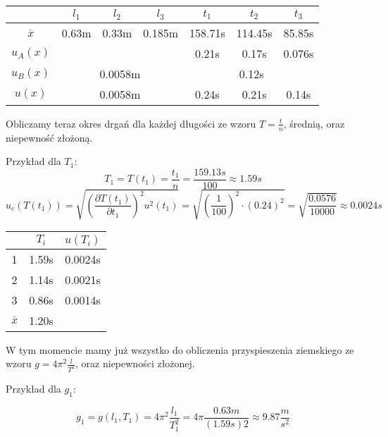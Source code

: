 \begin{center}
    \begin{tabular}[h]{|c|c|c|c||c|c|c|}
        \hline
                       & $l_1$ & $l_2$ & $l_3$         & $t_1$    & $t_2$   & $t_3$ \\
        \hline
        $\overline{x}$ & 0.63m & 0.33m & 0.185m        & 158.71s  & 114.45s & 85.85s \\
        \hline
        $u_A(x)$       &  \multicolumn{3}{|c||}{\cellcolor{black!10}}       & 0.21s & 0.17s & 0.076s \\
        \hline
        $u_B(x)$       & \multicolumn{3}{c||}{0.0058m} & \multicolumn{3}{c|}{0.12s} \\
        \hline
        $u(x)$         & \multicolumn{3}{c||}{0.0058m} & 0.24s & 0.21s & 0.14s \\
        \hline
    \end{tabular}
\end{center}
Obliczamy teraz okres drgań dla każdej długości ze wzoru $T = \frac{t}{n}$, średnią, oraz niepewność złożoną.

\indent Przykład dla $T_1$:
$$ T_1 = T(t_1) = \frac{t_1}{n} = \frac{159.13s}{100} \approx 1.59s $$
$$
u_c(T(t_1)) = \sqrt{ \left( \frac{\partial T(t_1)}{\partial t_1} \right)^2 u^2(t_1)}
= \sqrt{ \left( \frac{1}{100} \right)^2 \cdot (0.24)^2}
= \sqrt{\frac{0.0576}{10000}} \approx 0.0024s
$$

\begin{center}
    \begin{tabular}[h]{|c|c|c|}
        \hline
        {}             & $T_i$ & $u(T_i)$ \\
        \hline
        1              & 1.59s & 0.0024s \\
        2              & 1.14s & 0.0021s \\
        3              & 0.86s & 0.0014s \\
        \hline
        $\overline{x}$ & 1.20s & \cellcolor{black!10} \\
        \hline
    \end{tabular}
\end{center}

W tym momencie mamy już wszystko do obliczenia przyspieszenia ziemskiego ze wzoru $\displaystyle g = 4\pi^2 \frac{l}{T^2}$, oraz niepewności złożonej.

\indent Przykład dla $g_1$:

$$ g_1 = g(l_1, T_1) = 4\pi^2 \frac{l_1}{T_1^2} = 4\pi \frac{0.63m}{(1.59s)2} \approx 9.87 \frac{m}{s^2} $$

